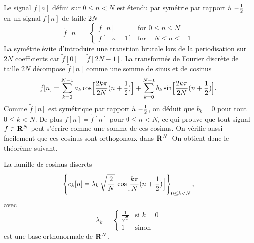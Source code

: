 Le signal $f[n]$ d\'efini sur $0 \leq n  < N$
est \'etendu par sym\'etrie par rapport \`a $- {\frac 1 2}$ en un
signal $\tilde f [n]$ de taille $2N$
\begin{equation}
\tilde f[n] =
   \left\{ \begin{array}{ll}
        f[n]& \mbox {for $0 \leq n \leq N$}\\
        f[-n-1] &\mbox {for $-N \leq n \leq -1$}
            \end{array}
   \right.
\end{equation}
La sym\'etrie \'evite d'introduire une transition brutale
lors de la periodisation sur $2N$ coefficients
car $\tilde f[0] = \tilde f[2N-1]$.
La transform\'ee de Fourier discr\`ete
de taille $2N$ d\'ecompose $\tilde f[n]$ comme une somme de
sinus et de cosinus
\[
\tilde f [n] =
\sum_{k=0}^{N-1} a_k \cos \Bigl[\frac {2 k\pi} {2N} (n+{\frac 1 2})\Bigr] +
\sum_{k=0}^{N-1} b_k \sin \Bigl[\frac {2k\pi} {2N} (n+{\frac 1 2})\Bigr] .
\]
Comme $\tilde f [n]$ est sym\'etrique par rapport
\`a $-{\frac 1 2}$, on d\'eduit que
$b_k = 0$ pour tout $0 \leq k < N$.
De plus $f[n] = \tilde f[n]$ pour $0 \leq n <N$, ce qui prouve
que tout signal $f \in {\bf{R}}^N$ peut s'\'ecrire comme une somme
de ces cosinus. On v\'erifie aussi facilement que ces
cosinus sont
orthogonaux dans ${\bf{R}}^N$. On obtient donc le th\'eor\`eme suivant.


\begin{theorem}
\label{th-discr-cos}
La famille de cosinus discrets
\[
\left\{ c_k [n] = {\lambda_k} \, \sqrt {\frac 2 N}\,
\cos\Bigl[\frac {k \pi} N (n+{\frac 1 2})\Bigr] \right\}_{ 0 \leq k < N},
\]
avec
\begin{equation}
\lambda_k =
   \left \{ \begin{array}{ll}
            \frac 1 {\sqrt 2 } & \mbox{si $k = 0$} \\
            1 &  \mbox{sinon}
            \end{array}
   \right.
\end{equation}
est une base orthonormale de ${\bf{R}}^N$.
\end{theorem}

